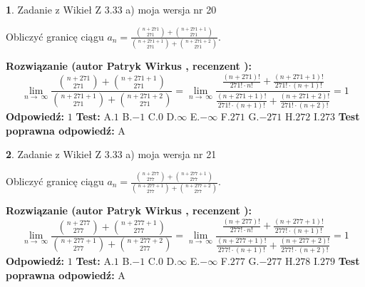 \documentclass[12pt, a4paper]{article}
\theoremstyle{definition} %
\newtheorem{zad}{}
\newcommand{\zadStart}[1]{\begin{zad}#1\newline}
\newcommand{\zadStop}{\end{zad}}
\newcommand{\rozwStart}[2]{\noindent \textbf{Rozwiązanie (autor #1 , recenzent #2): }\newline}
\newcommand{\rozwStop}{\newline}
\newcommand{\odpStart}{\noindent \textbf{Odpowiedź:}\newline}
\newcommand{\odpStop}{\newline}
\newcommand{\testStart}{\noindent \textbf{Test:}\newline}
\newcommand{\testStop}{\newline}
\newcommand{\kluczStart}{\noindent \textbf{Test poprawna odpowiedź:}\newline}
\newcommand{\kluczStop}{\newline}
\begin{document}
\zadStart{Zadanie z Wikieł Z 3.33 a) moja wersja nr 20}

Obliczyć granicę ciągu $a_{n}=\frac{{n+271\choose271}+{n+271+1\choose271}}{{n+271+1\choose271}+{n+271+2\choose271}}$.
\zadStop
\rozwStart{Patryk Wirkus}{}
$$\lim\limits_{n\to\ \infty}\frac{{n+271\choose271}+{n+271+1\choose271}}{{n+271+1\choose271}+{n+271+2\choose271}} = \lim\limits_{n\to\ \infty}\frac{\frac{(n+271)!}{271! \cdot n!}+\frac{(n+271+1)!}{271! \cdot (n+1)!}}{\frac{(n+271+1)!}{271! \cdot (n+1)!}+\frac{(n+271+2)!}{271! \cdot (n+2)!}} = 1$$
\rozwStop
\odpStart
$1$
\odpStop
\testStart
A.$1$ B.$-1$ C.$0$ D.$\infty$ E.$-\infty$
F.$271$ G.$-271$
H.$272$
I.$273$
\testStop
\kluczStart
A
\kluczStop



\zadStart{Zadanie z Wikieł Z 3.33 a) moja wersja nr 21}

Obliczyć granicę ciągu $a_{n}=\frac{{n+277\choose277}+{n+277+1\choose277}}{{n+277+1\choose277}+{n+277+2\choose277}}$.
\zadStop
\rozwStart{Patryk Wirkus}{}
$$\lim\limits_{n\to\ \infty}\frac{{n+277\choose277}+{n+277+1\choose277}}{{n+277+1\choose277}+{n+277+2\choose277}} = \lim\limits_{n\to\ \infty}\frac{\frac{(n+277)!}{277! \cdot n!}+\frac{(n+277+1)!}{277! \cdot (n+1)!}}{\frac{(n+277+1)!}{277! \cdot (n+1)!}+\frac{(n+277+2)!}{277! \cdot (n+2)!}} = 1$$
\rozwStop
\odpStart
$1$
\odpStop
\testStart
A.$1$ B.$-1$ C.$0$ D.$\infty$ E.$-\infty$
F.$277$ G.$-277$
H.$278$
I.$279$
\testStop
\kluczStart
A
\kluczStop
\end{document}

